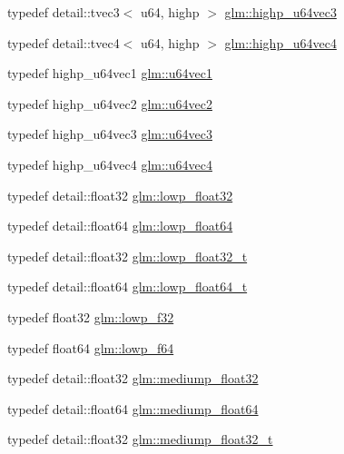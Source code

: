 \begin{DoxyCompactItemize}
\item 
typedef detail\+::tvec3$<$ u64, highp $>$ \hyperlink{group__gtc__type__precision_ga3cb5c038f8cba0dfb894af66b7b2ba13}{glm\+::highp\+\_\+u64vec3}
\item 
typedef detail\+::tvec4$<$ u64, highp $>$ \hyperlink{group__gtc__type__precision_ga8aa6fc9f16dfa3078d411f6361188a45}{glm\+::highp\+\_\+u64vec4}
\item 
typedef highp\+\_\+u64vec1 \hyperlink{group__gtc__type__precision_ga7d5145019ad749f4becd39ce8e786a5f}{glm\+::u64vec1}
\item 
typedef highp\+\_\+u64vec2 \hyperlink{group__gtc__type__precision_gaffa78d655fd98b33e47043e2bd38641b}{glm\+::u64vec2}
\item 
typedef highp\+\_\+u64vec3 \hyperlink{group__gtc__type__precision_gae934e74663d832989066cc852560866d}{glm\+::u64vec3}
\item 
typedef highp\+\_\+u64vec4 \hyperlink{group__gtc__type__precision_ga59d78a1ff6d275bbb425dce92f607b9c}{glm\+::u64vec4}
\item 
typedef detail\+::float32 \hyperlink{group__gtc__type__precision_ga92be8087f3c84504f3a44af1a9efc51e}{glm\+::lowp\+\_\+float32}
\item 
typedef detail\+::float64 \hyperlink{group__gtc__type__precision_ga32e02689f4e83fb269c9047418536f2c}{glm\+::lowp\+\_\+float64}
\item 
typedef detail\+::float32 \hyperlink{group__gtc__type__precision_gadfb453b23cb820e3e4e766e047c67dab}{glm\+::lowp\+\_\+float32\+\_\+t}
\item 
typedef detail\+::float64 \hyperlink{group__gtc__type__precision_gac9d64f4e69d6c2eade41a848077866b5}{glm\+::lowp\+\_\+float64\+\_\+t}
\item 
typedef float32 \hyperlink{group__gtc__type__precision_ga1b9734de4b4429dc26b1454a2a399b05}{glm\+::lowp\+\_\+f32}
\item 
typedef float64 \hyperlink{group__gtc__type__precision_ga59839f4bf6b97c93b0def577890bbfb8}{glm\+::lowp\+\_\+f64}
\item 
typedef detail\+::float32 \hyperlink{group__gtc__type__precision_ga1b5f74cbeed0c9d42cd57d77609be7ee}{glm\+::mediump\+\_\+float32}
\item 
typedef detail\+::float64 \hyperlink{group__gtc__type__precision_ga9225ae6aed0f90b6eb65bf8d466199c1}{glm\+::mediump\+\_\+float64}
\item 
typedef detail\+::float32 \hyperlink{group__gtc__type__precision_gacbd406715148db96c9d9d2a2ef6460de}{glm\+::mediump\+\_\+float32\+\_\+t}

\end{DoxyCompactItemize}
